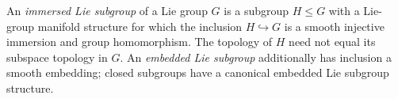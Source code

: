 
An \emph{immersed Lie subgroup} of a Lie group $G$ is a subgroup $H\le G$ with a Lie-group manifold structure for which the inclusion $H\hookrightarrow G$ is a smooth injective immersion and group homomorphism. The topology of $H$ need not equal its subspace topology in $G$. An \emph{embedded Lie subgroup} additionally has inclusion a smooth embedding; closed subgroups have a canonical embedded Lie subgroup structure.
